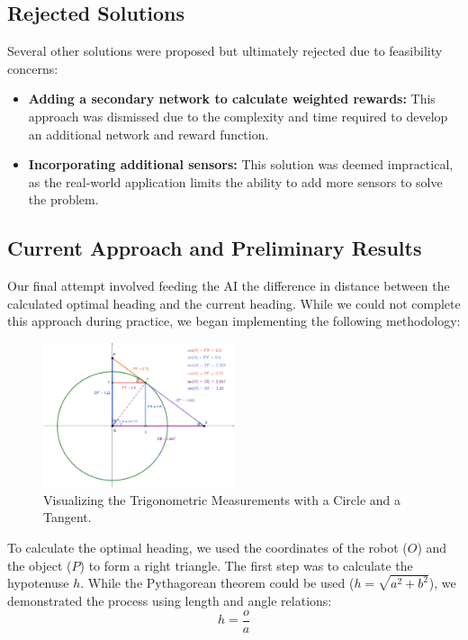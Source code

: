\subsection*{Rejected Solutions}
Several other solutions were proposed but ultimately rejected due to feasibility concerns:
\begin{itemize}
    \item \textbf{Adding a secondary network to calculate weighted rewards:} This approach was dismissed due to the complexity and time required to develop an additional network and reward function.
    \item \textbf{Incorporating additional sensors:} This solution was deemed impractical, as the real-world application limits the ability to add more sensors to solve the problem.
\end{itemize}

\subsection*{Current Approach and Preliminary Results}
Our final attempt involved feeding the AI the difference in distance between the calculated optimal heading and the current heading. While we could not complete this approach during practice, we began implementing the following methodology:

\begin{figure}[H]
\centering
\includegraphics[width=0.5\textwidth]{images/Ian'sTrig.png}
\caption{Visualizing the Trigonometric Measurements with a Circle and a Tangent. \cite{anirdesh}}
\label{fig:anirdesh}
\end{figure}

To calculate the optimal heading, we used the coordinates of the robot ($O$) and the object ($P$) to form a right triangle. The first step was to calculate the hypotenuse $h$. While the Pythagorean theorem could be used ($h = \sqrt{a^2 + b^2}$), we demonstrated the process using length and angle relations:
\[
    h = \frac{o}{a}
\]

